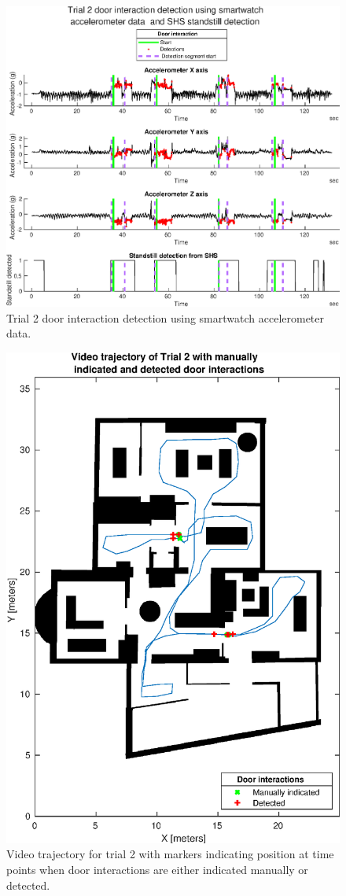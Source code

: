 \restoregeometry



\begin{figure}[H]
	\centering
	\includegraphics[width=0.8\linewidth]{images/20201201_1504_Trial_2_door_interaction_detection_using_smartwatch_1}
	\setlength{\belowcaptionskip}{-20pt}
	\caption{Trial 2 door interaction detection using smartwatch accelerometer data.}
	\label{fig:202011292139trial2doorinteractiondetectionusingsmartwatch1}
\end{figure}
\begin{figure}[H]
	\centering
	\includegraphics[width=0.7\linewidth]{images/20201129_2330_video_traj_Trial_2_door_detect_vs_manual_1}
	\setlength{\belowcaptionskip}{-20pt}
	\caption{Video trajectory for trial 2 with markers indicating position at time points when door interactions are either indicated manually or detected.}
	\label{fig:202011292330videotrajtrial2doordetectvsmanual1}
\end{figure}


